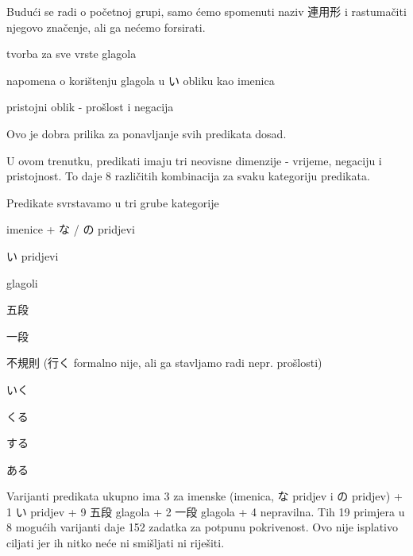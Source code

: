 
\author{Tomislav Mamić}

	
	Budući se radi o početnoj grupi, samo ćemo spomenuti naziv 連用形 i rastumačiti njegovo značenje, ali ga nećemo forsirati.
	
	\begin{hyou}
		\item tvorba za sve vrste glagola
		\item napomena o korištenju glagola u い obliku kao imenica
		\item pristojni oblik - prošlost i negacija
	\end{hyou}

	
	\noindent Ovo je dobra prilika za ponavljanje svih predikata dosad.
	\begin{hyou}
		\item U ovom trenutku, predikati imaju tri neovisne dimenzije - vrijeme, negaciju i pristojnost. To daje 8 različitih kombinacija za svaku kategoriju predikata.
		\item Predikate svrstavamo u tri grube kategorije
		\begin{hyou}
			\item imenice + な / の pridjevi
			\item い pridjevi
			\item glagoli
			\begin{hyou}
				\itemsep0pt
				\item 五段
				\item 一段
				\item 不規則 (行く formalno nije, ali ga stavljamo radi nepr. prošlosti)
				\begin{hyou}
					\itemsep0pt
					\item いく
					\item くる
					\item する
					\item ある
				\end{hyou}
			\end{hyou}
		\end{hyou}
	\end{hyou}

\vspace{-50pt}\noindent Varijanti predikata ukupno ima 3 za imenske (imenica, な pridjev i の pridjev) + 1 い pridjev + 9 五段 glagola + 2 一段 glagola + 4 nepravilna. Tih 19 primjera u 8 mogućih varijanti daje 152 zadatka za potpunu pokrivenost. Ovo nije isplativo ciljati jer ih nitko neće ni smišljati ni riješiti.

